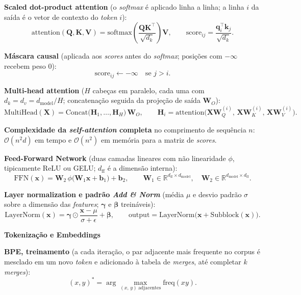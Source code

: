 \documentclass[11pt,a4paper]{article}
\newcommand{\bloco}[1]{%
  \par\vspace{0.3em}%
  {\bfseries\large #1}\par%
  \vspace{-0.4em}{\color{gray!60}\rule{\linewidth}{0.4pt}}\par%
}
\begin{document}
\textbf{Scaled dot-product attention} (o \textit{softmax} é aplicado linha a linha; a linha $i$ da saída é o vetor de contexto do \textit{token} $i$):
\[
  \mathrm{attention}(\mathbf{Q}, \mathbf{K}, \mathbf{V}) = \mathrm{softmax}\!\left(\frac{\mathbf{Q}\mathbf{K}^{\top}}{\sqrt{d_k}}\right)\mathbf{V},
  \qquad
  \text{score}_{ij} = \frac{\mathbf{q}_i^{\top}\mathbf{k}_j}{\sqrt{d_k}}.
\]

\textbf{Máscara causal} (aplicada aos \textit{scores} antes do \textit{softmax}; posições com $-\infty$ recebem peso $0$):
\[
  \text{score}_{ij} \leftarrow -\infty \quad \text{se } j > i.
\]

\textbf{Multi-head attention} ($H$ cabeças em paralelo, cada uma com $d_k = d_v = d_\text{model}/H$; concatenação seguida da projeção de saída $\mathbf{W}_O$):
\[
  \mathrm{MultiHead}(\mathbf{X}) = \mathrm{Concat}\bigl(\mathbf{H}_1, \dots, \mathbf{H}_H\bigr)\,\mathbf{W}_O,
  \qquad
  \mathbf{H}_i = \mathrm{attention}\bigl(\mathbf{X}\mathbf{W}_Q^{(i)},\, \mathbf{X}\mathbf{W}_K^{(i)},\, \mathbf{X}\mathbf{W}_V^{(i)}\bigr).
\]

\textbf{Complexidade da \textit{self-attention} completa} no comprimento de sequência $n$: $\mathcal{O}(n^{2} d)$ em tempo e $\mathcal{O}(n^{2})$ em memória para a matriz de \textit{scores}.

\textbf{Feed-Forward Network} (duas camadas lineares com não linearidade $\phi$, tipicamente ReLU ou GELU; $d_\text{ff}$ é a dimensão interna):
\[
  \mathrm{FFN}(\mathbf{x}) = \mathbf{W}_2\,\phi\bigl(\mathbf{W}_1\mathbf{x} + \mathbf{b}_1\bigr) + \mathbf{b}_2,
  \qquad
  \mathbf{W}_1 \in \mathbb{R}^{d_\text{ff} \times d_\text{model}}, \quad
  \mathbf{W}_2 \in \mathbb{R}^{d_\text{model} \times d_\text{ff}}.
\]

\textbf{Layer normalization e padrão \textit{Add \& Norm}} (média $\mu$ e desvio padrão $\sigma$ sobre a dimensão das \textit{features}; $\boldsymbol{\gamma}$ e $\boldsymbol{\beta}$ treináveis):
\[
  \mathrm{LayerNorm}(\mathbf{x}) = \boldsymbol{\gamma} \odot \frac{\mathbf{x} - \mu}{\sigma + \epsilon} + \boldsymbol{\beta},
  \qquad
  \text{output} = \mathrm{LayerNorm}\bigl(\mathbf{x} + \mathrm{Subblock}(\mathbf{x})\bigr).
\]

\bloco{Tokenização e Embeddings}

\textbf{BPE, treinamento} (a cada iteração, o par adjacente mais frequente no corpus é mesclado em um novo \textit{token} e adicionado à tabela de \textit{merges}, até completar $k$ \textit{merges}):
\[
  (x, y)^{*} = \arg\max_{(x,\,y)\ \text{adjacentes}} \mathrm{freq}(xy).
\]
\end{document}
